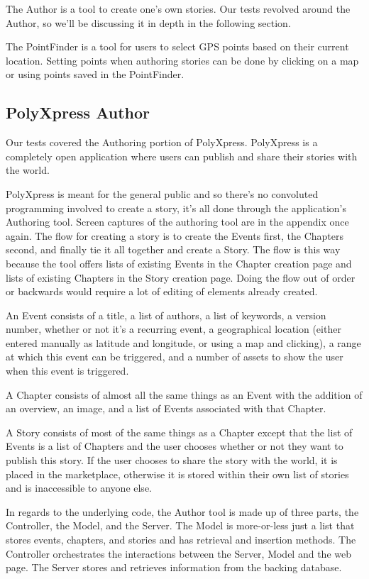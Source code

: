 \documentclass[12pt]{ucthesis}
\begin{document}
The Author is a tool to create one's own stories. Our tests revolved around the Author, so we'll be discussing it in depth in the following section.

The PointFinder is a tool for users to select GPS points based on their current location. Setting points when authoring stories can be done by clicking on a map or using points saved in the PointFinder.

\subsection{PolyXpress Author}
Our tests covered the Authoring portion of PolyXpress. PolyXpress is a completely open application where users can publish and share their stories with the world. 

PolyXpress is meant for the general public and so there's no convoluted programming involved to create a story, it's all done through the application's Authoring tool. Screen captures of the authoring tool are in the appendix once again. The flow for creating a story is to create the Events first, the Chapters second, and finally tie it all together and create a Story. The flow is this way because the tool offers lists of existing Events in the Chapter creation page and lists of existing Chapters in the Story creation page. Doing the flow out of order or backwards would require a lot of editing of elements already created.

An Event consists of a title, a list of authors, a list of keywords, a version number, whether or not it's a recurring event, a geographical location (either entered manually as latitude and longitude, or using a map and clicking), a range at which this event can be triggered, and a number of assets to show the user when this event is triggered.

A Chapter consists of almost all the same things as an Event with the addition of an overview, an image, and a list of Events associated with that Chapter.

A Story consists of most of the same things as a Chapter except that the list of Events is a list of Chapters and the user chooses whether or not they want to publish this story. If the user chooses to share the story with the world, it is placed in the marketplace, otherwise it is stored within their own list of stories and is inaccessible to anyone else.

In regards to the underlying code, the Author tool is made up of three parts, the Controller, the Model, and the Server. The Model is more-or-less just a list that stores events, chapters, and stories and has retrieval and insertion methods. The Controller orchestrates the interactions between the Server, Model and the web page. The Server stores and retrieves information from the backing database.
\end{document}
